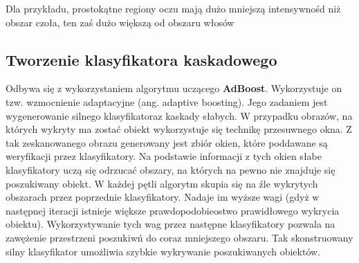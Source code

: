 Dla przykładu, prostokątne regiony oczu mają dużo mniejszą intensywnośd niż obszar czoła, ten zaś dużo większą od obszaru włosów 

\subsection{Tworzenie klasyfikatora kaskadowego}
Odbywa się z wykorzystaniem algorytmu uczącego \textbf{AdBoost}. Wykorzystuje on tzw. wzmocnienie adaptacyjne (ang. adaptive boosting). Jego
zadaniem jest wygenerowanie silnego klasyfikatoraz kaskady słabych. W przypadku obrazów, na których wykryty ma zostać obiekt wykorzystuje się technikę przesuwnego okna. Z tak zeskanowanego obrazu generowany jest zbiór okien, które poddawane są weryfikacji przez klasyfikatory. Na podstawie informacji z tych okien słabe klasyfikatory uczą się odrzucać obszary, na których na pewno nie znajduje się poszukiwany obiekt. W każdej pętli algorytm skupia się na źle wykrytych obszarach przez poprzednie klasyfikatory. Nadaje im wyższe wagi (gdyż w następnej iteracji istnieje większe prawdopodobieostwo prawidłowego wykrycia obiektu). Wykorzystywanie tych wag przez następne klasyfikatory pozwala na zawężenie przestrzeni poszukiwń do coraz mniejszego obszaru. Tak skonstruowany silny klasyfikator umożliwia szybkie wykrywanie poszukiwanych obiektów.
